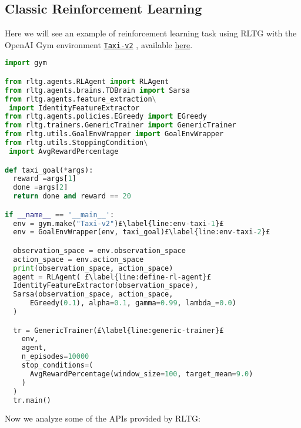 \subsection{Classic Reinforcement Learning}
Here we will see an example of reinforcement learning task using RLTG with the OpenAI Gym environment \href{https://gym.openai.com/envs/Taxi-v2/}{\texttt{Taxi-v2}} \citep{Dietterich98themaxq}, available \href{https://github.com/MarcoFavorito/rltg/blob/master/examples/taxi.py}{here}.
\begin{lstlisting}[style=Python, language=Python, escapechar=£, label={ex:rltg-classic-rl-example}, caption={Classic Reinforcement Learning using RLTG}]
import gym

from rltg.agents.RLAgent import RLAgent
from rltg.agents.brains.TDBrain import Sarsa
from rltg.agents.feature_extraction\
 import IdentityFeatureExtractor
from rltg.agents.policies.EGreedy import EGreedy
from rltg.trainers.GenericTrainer import GenericTrainer
from rltg.utils.GoalEnvWrapper import GoalEnvWrapper
from rltg.utils.StoppingCondition\
 import AvgRewardPercentage

def taxi_goal(*args):
  reward =args[1]
  done =args[2]
  return done and reward == 20

if __name__ == '__main__':
  env = gym.make("Taxi-v2")£\label{line:env-taxi-1}£
  env = GoalEnvWrapper(env, taxi_goal)£\label{line:env-taxi-2}£

  observation_space = env.observation_space
  action_space = env.action_space
  print(observation_space, action_space)
  agent = RLAgent( £\label{line:define-rl-agent}£
  IdentityFeatureExtractor(observation_space),
  Sarsa(observation_space, action_space,
      EGreedy(0.1), alpha=0.1, gamma=0.99, lambda_=0.0)
  )

  tr = GenericTrainer(£\label{line:generic-trainer}£
    env,
    agent,
    n_episodes=10000
    stop_conditions=(
      AvgRewardPercentage(window_size=100, target_mean=9.0)
    )
  )
  tr.main()
\end{lstlisting}
Now we analyze some of the APIs provided by RLTG:
